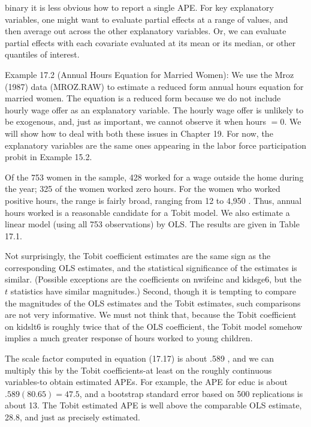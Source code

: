 \documentclass[10pt]{article}
\begin{document}
binary it is less obvious how to report a single APE. For key explanatory variables, one might want to evaluate partial effects at a range of values, and then average out across the other explanatory variables. Or, we can evaluate partial effects with each covariate evaluated at its mean or its median, or other quantiles of interest.

Example 17.2 (Annual Hours Equation for Married Women): We use the Mroz (1987) data (MROZ.RAW) to estimate a reduced form annual hours equation for married women. The equation is a reduced form because we do not include hourly wage offer as an explanatory variable. The hourly wage offer is unlikely to be exogenous, and, just as important, we cannot observe it when hours $=0$. We will show how to deal with both these issues in Chapter 19. For now, the explanatory variables are the same ones appearing in the labor force participation probit in Example 15.2.

Of the 753 women in the sample, 428 worked for a wage outside the home during the year; 325 of the women worked zero hours. For the women who worked positive hours, the range is fairly broad, ranging from 12 to 4,950 . Thus, annual hours worked is a reasonable candidate for a Tobit model. We also estimate a linear model (using all 753 observations) by OLS. The results are given in Table 17.1.

Not surprisingly, the Tobit coefficient estimates are the same sign as the corresponding OLS estimates, and the statistical significance of the estimates is similar. (Possible exceptions are the coefficients on nwifeinc and kidsge6, but the $t$ statistics have similar magnitudes.) Second, though it is tempting to compare the magnitudes of the OLS estimates and the Tobit estimates, such comparisons are not very informative. We must not think that, because the Tobit coefficient on kidslt6 is roughly twice that of the OLS coefficient, the Tobit model somehow implies a much greater response of hours worked to young children.

The scale factor computed in equation (17.17) is about .589 , and we can multiply this by the Tobit coefficients-at least on the roughly continuous variables-to obtain estimated APEs. For example, the APE for educ is about $.589(80.65)=47.5$, and a bootstrap standard error based on 500 replications is about 13. The Tobit estimated APE is well above the comparable OLS estimate, 28.8, and just as precisely estimated.
\end{document}
